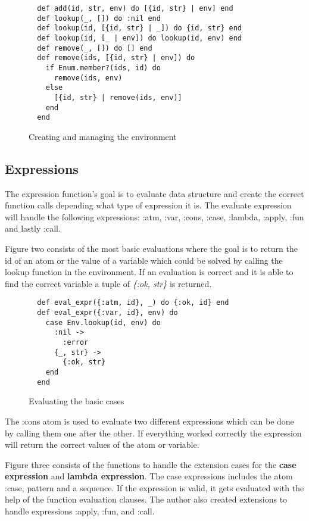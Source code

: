 \documentclass[a4paper,11pt]{article}
\begin{document}
\begin{figure}[H]
\begin{verbatim}
  def add(id, str, env) do [{id, str} | env] end
  def lookup(_, []) do :nil end
  def lookup(id, [{id, str} | _]) do {id, str} end
  def lookup(id, [_ | env]) do lookup(id, env) end
  def remove(_, []) do [] end
  def remove(ids, [{id, str} | env]) do
    if Enum.member?(ids, id) do
      remove(ids, env)
    else
      [{id, str} | remove(ids, env)]
    end
  end
\end{verbatim}
\caption{Creating and managing the environment}
\label{Figure:1}
\end{figure}

\subsection*{Expressions}
The expression function’s goal is to evaluate data structure and create the correct function calls depending what type of expression it is. The evaluate expression will handle the following expressions: :atm, :var, :cons, :case, :lambda, :apply, :fun and lastly :call.

Figure two consists of the most basic evaluations where the goal is to return the id of an atom or the value of a variable which could be solved by calling the lookup function in the environment. If an evaluation is correct and it is able to find the correct variable a tuple of \textit{\{:ok, str\}} is returned.


\begin{figure}[H]
\begin{verbatim}
  def eval_expr({:atm, id}, _) do {:ok, id} end
  def eval_expr({:var, id}, env) do
    case Env.lookup(id, env) do
      :nil ->
        :error
      {_, str} ->
        {:ok, str}
    end
  end
\end{verbatim}
\caption{Evaluating the basic cases}
\label{Figure:2}
\end{figure}

The :cons atom is used to evaluate two different expressions which can be done by calling them one after the other. If everything worked correctly the expression will return the correct values of the atom or variable.

Figure three consists of the functions to handle the extension cases for the \textbf{case expression} and \textbf{lambda expression}. The case expressions includes the atom :case, pattern and a sequence. If the expression is valid, it gets evaluated with the help of the function evaluation clauses. The author also created extensions to handle expressions :apply, :fun, and :call. 
\end{document}

